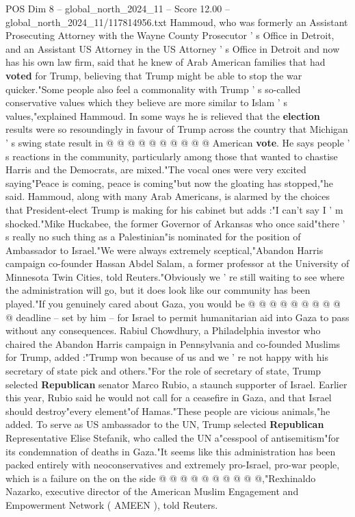 \begin{textsample}{POS Dim 8 – global\_north\_2024\_11 – Score 12.00 – global\_north\_2024\_11/117814956.txt}
Hammoud, who was formerly an Assistant Prosecuting Attorney with the Wayne County Prosecutor ' s Office in Detroit, and an Assistant US Attorney in the US Attorney ' s Office in Detroit and now has his own law firm, said that he knew of Arab American families that had \textbf{voted} for Trump, believing that Trump might be able to stop the war quicker."Some people also feel a commonality with Trump ' s so-called conservative values which they believe are more similar to Islam ' s values,"explained Hammoud.
In some ways he is relieved that the \textbf{election} results were so resoundingly in favour of Trump across the country that Michigan ' s swing state result in @ @ @ @ @ @ @ @ @ @ American \textbf{vote}.
He says people ' s reactions in the community, particularly among those that wanted to chastise Harris and the Democrats, are mixed."The vocal ones were very excited saying"Peace is coming, peace is coming"but now the gloating has stopped,"he said.
Hammoud, along with many Arab Americans, is alarmed by the choices that President-elect Trump is making for his cabinet but adds :"I can't say I ' m shocked."Mike Huckabee, the former Governor of Arkansas who once said"there ' s really no such thing as a Palestinian"is nominated for the position of Ambassador to Israel."We were always extremely sceptical,"Abandon Harris campaign co-founder Hassan Abdel Salam, a former professor at the University of Minnesota Twin Cities, told Reuters."Obviously we ' re still waiting to see where the administration will go, but it does look like our community has been played."If you genuinely cared about Gaza, you would be @ @ @ @ @ @ @ @ @ @ deadline -- set by him -- for Israel to permit humanitarian aid into Gaza to pass without any consequences.
Rabiul Chowdhury, a Philadelphia investor who chaired the Abandon Harris campaign in Pennsylvania and co-founded Muslims for Trump, added :"Trump won because of us and we ' re not happy with his secretary of state pick and others."For the role of secretary of state, Trump selected \textbf{Republican} senator Marco Rubio, a staunch supporter of Israel.
Earlier this year, Rubio said he would not call for a ceasefire in Gaza, and that Israel should destroy"every element"of Hamas."These people are vicious animals,"he added.
To serve as US ambassador to the UN, Trump selected \textbf{Republican} Representative Elise Stefanik, who called the UN a"cesspool of antisemitism"for its condemnation of deaths in Gaza."It seems like this administration has been packed entirely with neoconservatives and extremely pro-Israel, pro-war people, which is a failure on the on the side @ @ @ @ @ @ @ @ @ @,"Rexhinaldo Nazarko, executive director of the American Muslim Engagement and Empowerment Network ( AMEEN ), told Reuters.

\end{textsample}
